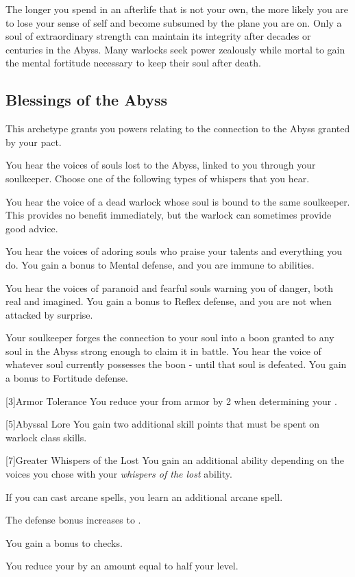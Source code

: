         The longer you spend in an afterlife that is not your own, the more likely you are to lose your sense of self and become subsumed by the plane you are on.
        Only a soul of extraordinary strength can maintain its integrity after decades or centuries in the Abyss.
        Many warlocks seek power zealously while mortal to gain the mental fortitude necessary to keep their soul after death.

    \subsection{Blessings of the Abyss}
        This archetype grants you powers relating to the connection to the Abyss granted by your pact.

         You hear the voices of souls lost to the Abyss, linked to you through your soulkeeper.
        Choose one of the following types of whispers that you hear.
        {
             You hear the voice of a dead warlock whose soul is bound to the same soulkeeper.
            This provides no benefit immediately, but the warlock can sometimes provide good advice.

             You hear the voices of adoring souls who praise your talents and everything you do.
            You gain a  bonus to Mental defense, and you are immune to  abilities.

             You hear the voices of paranoid and fearful souls warning you of danger, both real and imagined.
            You gain a  bonus to Reflex defense, and you are not \unaware when attacked by surprise.

             Your soulkeeper forges the connection to your soul into a boon granted to any soul in the Abyss strong enough to claim it in battle.
            You hear the voice of whatever soul currently possesses the boon - until that soul is defeated.
            You gain a  bonus to Fortitude defense.
        }

        [3]{Armor Tolerance} You reduce your  from armor by 2 when determining your .

        [5]{Abyssal Lore} You gain two additional skill points that must be spent on warlock class skills.

        [7]{Greater Whispers of the Lost} You gain an additional ability depending on the voices you chose with your \textit{whispers of the lost} ability.
        {
             If you can cast arcane spells, you learn an additional arcane spell.

             The defense bonus increases to .

             You gain a  bonus to  checks.

             You reduce your  by an amount equal to half your level.
        }

